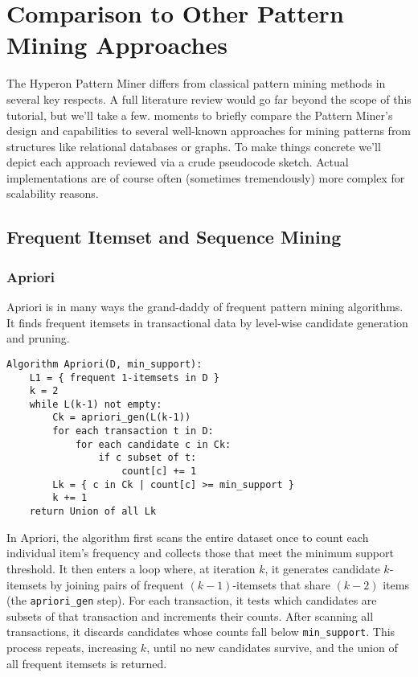 \section{Comparison to Other Pattern Mining Approaches}

The Hyperon Pattern Miner differs from classical pattern mining methods in several key respects.   A full literature review would go far beyond the scope of this tutorial, but we'll take a few. moments to briefly compare the Pattern Miner's design and capabilities to several well-known approaches for mining patterns from structures like relational databases or graphs.   To make things concrete we'll depict each approach reviewed via a crude pseudocode sketch.  Actual implementations are of course often (sometimes tremendously) more complex for scalability reasons.


\subsection{Frequent Itemset and Sequence Mining}
\subsubsection{Apriori}

Apriori \cite{agrawal1994fast} is in many ways the grand-daddy of frequent pattern mining algorithms.  It finds frequent itemsets in transactional data by level-wise candidate generation and pruning.

\begin{verbatim}
Algorithm Apriori(D, min_support):
    L1 = { frequent 1-itemsets in D }
    k = 2
    while L(k-1) not empty:
        Ck = apriori_gen(L(k-1))
        for each transaction t in D:
            for each candidate c in Ck:
                if c subset of t:
                    count[c] += 1
        Lk = { c in Ck | count[c] >= min_support }
        k += 1
    return Union of all Lk
\end{verbatim}

In Apriori, the algorithm first scans the entire dataset once to count each individual item's frequency and collects those that meet the minimum support threshold.  It then enters a loop where, at iteration \(k\), it generates candidate \(k\)-itemsets by joining pairs of frequent \((k-1)\)-itemsets that share \((k-2)\) items (the \texttt{apriori\_gen} step).  For each transaction, it tests which candidates are subsets of that transaction and increments their counts.  After scanning all transactions, it discards candidates whose counts fall below \texttt{min\_support}.  This process repeats, increasing \(k\), until no new candidates survive, and the union of all frequent itemsets is returned.

